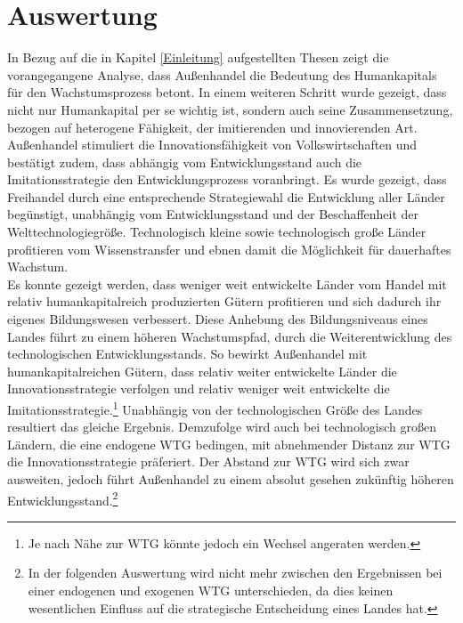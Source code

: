 
\chapter{Auswertung}\label{Auswertung}

In Bezug auf die in Kapitel \ref{Einleitung} aufgestellten Thesen zeigt die vorangegangene Analyse, dass Au{\ss}enhandel die Bedeutung des Humankapitals f{\"u}r den Wachstumsprozess betont. In einem weiteren Schritt wurde gezeigt, dass nicht nur Humankapital per se wichtig ist, sondern auch seine Zusammensetzung,  bezogen auf heterogene F{\"a}higkeit, der imitierenden und innovierenden Art. Au{\ss}enhandel stimuliert die Innovationsf{\"a}higkeit von Volkswirtschaften und best{\"a}tigt zudem, dass abh{\"a}ngig vom Entwicklungsstand auch die Imitationsstrategie den Entwicklungsprozess voranbringt. Es wurde gezeigt, dass Freihandel durch eine entsprechende Strategiewahl die Entwicklung aller L{\"a}nder beg{\"u}nstigt, unabh{\"a}ngig vom Entwicklungsstand und der Beschaffenheit der Welttechnologiegr{\"o}{\ss}e. Technologisch kleine sowie technologisch gro{\ss}e L{\"a}nder profitieren vom Wissenstransfer und ebnen damit die M{\"o}glichkeit f{\"u}r dauerhaftes Wachstum.\\


Es konnte gezeigt werden, dass weniger weit entwickelte L{\"a}nder vom Handel mit relativ humankapitalreich produzierten G{\"u}tern profitieren und sich dadurch ihr eigenes Bildungswesen verbessert. Diese Anhebung des Bildungsniveaus eines Landes f{\"u}hrt zu einem h{\"o}heren Wachstumspfad, durch die Weiterentwicklung des technologischen Entwicklungsstands. So bewirkt Au{\ss}enhandel mit humankapitalreichen G{\"u}tern, dass relativ weiter entwickelte L{\"a}nder die Innovationsstrategie verfolgen und relativ weniger weit entwickelte die Imitationsstrategie.\footnote{Je nach N{\"a}he zur WTG k{\"o}nnte jedoch ein Wechsel angeraten werden.} Unabh{\"a}ngig von der technologischen Gr{\"o}{\ss}e des Landes resultiert das gleiche Ergebnis. Demzufolge wird auch bei technologisch gro{\ss}en L{\"a}ndern, die eine endogene WTG bedingen, mit abnehmender Distanz zur WTG die Innovationsstrategie pr{\"a}feriert. Der Abstand zur WTG wird sich zwar ausweiten, jedoch f{\"u}hrt Au{\ss}enhandel zu einem absolut gesehen zuk{\"u}nftig h{\"o}heren Entwicklungsstand.\footnote{In der folgenden Auswertung wird nicht mehr zwischen den Ergebnissen bei einer endogenen und exogenen WTG unterschieden, da dies keinen wesentlichen Einfluss auf die strategische Entscheidung eines Landes hat.}\newline


